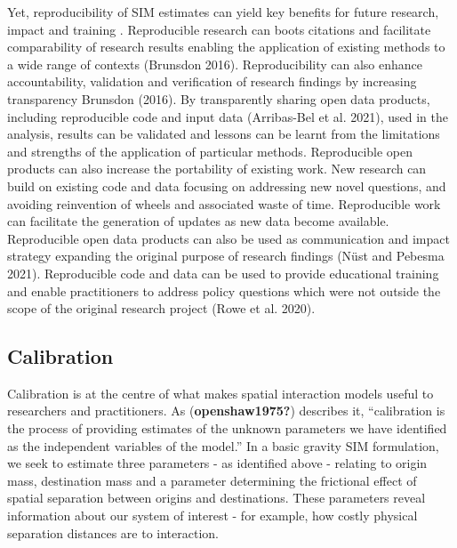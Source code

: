 \documentclass[11pt,letterpaper]{article}
\begin{document}
Yet, reproducibility of SIM estimates can yield key benefits for future research, impact and training .
Reproducible research can boots citations and facilitate comparability of research results enabling the application of existing methods to a wide range of contexts (Brunsdon 2016). Reproducibility can also enhance accountability, validation and verification of research findings by increasing transparency Brunsdon (2016).
By transparently sharing open data products, including reproducible code and input data (Arribas-Bel et al. 2021), used in the analysis, results can be validated and lessons can be learnt from the limitations and strengths of the application of particular methods.
Reproducible open products can also increase the portability of existing work.
New research can build on existing code and data focusing on addressing new novel questions, and avoiding reinvention of wheels and associated waste of time.
Reproducible work can facilitate the generation of updates as new data become available.
Reproducible open data products can also be used as communication and impact strategy expanding the original purpose of research findings (Nüst and Pebesma 2021).
Reproducible code and data can be used to provide educational training and enable practitioners to address policy questions which were not outside the scope of the original research project (Rowe et al. 2020).

\hypertarget{calibration}{%
\subsection{Calibration}\label{calibration}}

Calibration is at the centre of what makes spatial interaction models useful to researchers and practitioners.
As (\textbf{openshaw1975?}) describes it, ``calibration is the process of providing estimates of the unknown parameters we have identified as the independent variables of the model.'' In a basic gravity SIM formulation, we seek to estimate three parameters - as identified above - relating to origin mass, destination mass and a parameter determining the frictional effect of spatial separation between origins and destinations.
These parameters reveal information about our system of interest - for example, how costly physical separation distances are to interaction.
\end{document}
